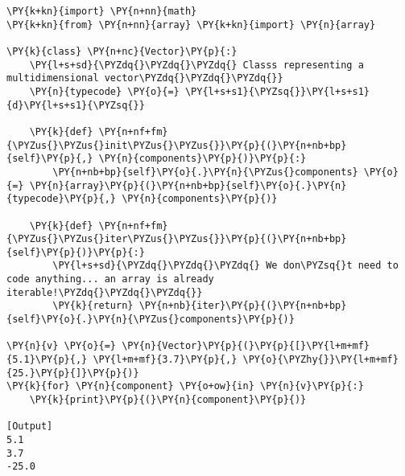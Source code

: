 \begin{Verbatim}[label=\makebox{\url{https://bitbucket.org/lbaldini/programming/src/tip/snippets/vector\_iterable.py}},commandchars=\\\{\}]
\PY{k+kn}{import} \PY{n+nn}{math}
\PY{k+kn}{from} \PY{n+nn}{array} \PY{k+kn}{import} \PY{n}{array}

\PY{k}{class} \PY{n+nc}{Vector}\PY{p}{:}
    \PY{l+s+sd}{\PYZdq{}\PYZdq{}\PYZdq{} Classs representing a multidimensional vector\PYZdq{}\PYZdq{}\PYZdq{}}    
    \PY{n}{typecode} \PY{o}{=} \PY{l+s+s1}{\PYZsq{}}\PY{l+s+s1}{d}\PY{l+s+s1}{\PYZsq{}}
    
    \PY{k}{def} \PY{n+nf+fm}{\PYZus{}\PYZus{}init\PYZus{}\PYZus{}}\PY{p}{(}\PY{n+nb+bp}{self}\PY{p}{,} \PY{n}{components}\PY{p}{)}\PY{p}{:}
        \PY{n+nb+bp}{self}\PY{o}{.}\PY{n}{\PYZus{}components} \PY{o}{=} \PY{n}{array}\PY{p}{(}\PY{n+nb+bp}{self}\PY{o}{.}\PY{n}{typecode}\PY{p}{,} \PY{n}{components}\PY{p}{)}
        
    \PY{k}{def} \PY{n+nf+fm}{\PYZus{}\PYZus{}iter\PYZus{}\PYZus{}}\PY{p}{(}\PY{n+nb+bp}{self}\PY{p}{)}\PY{p}{:}
        \PY{l+s+sd}{\PYZdq{}\PYZdq{}\PYZdq{} We don\PYZsq{}t need to code anything... an array is already iterable!\PYZdq{}\PYZdq{}\PYZdq{}}
        \PY{k}{return} \PY{n+nb}{iter}\PY{p}{(}\PY{n+nb+bp}{self}\PY{o}{.}\PY{n}{\PYZus{}components}\PY{p}{)}
    
\PY{n}{v} \PY{o}{=} \PY{n}{Vector}\PY{p}{(}\PY{p}{[}\PY{l+m+mf}{5.1}\PY{p}{,} \PY{l+m+mf}{3.7}\PY{p}{,} \PY{o}{\PYZhy{}}\PY{l+m+mf}{25.}\PY{p}{]}\PY{p}{)}
\PY{k}{for} \PY{n}{component} \PY{o+ow}{in} \PY{n}{v}\PY{p}{:}
    \PY{k}{print}\PY{p}{(}\PY{n}{component}\PY{p}{)}

[Output]
5.1
3.7
-25.0
\end{Verbatim}